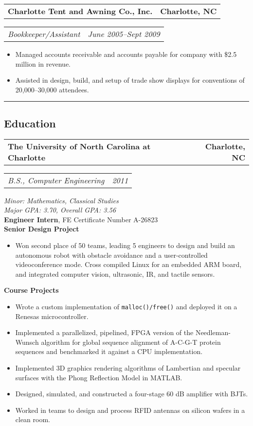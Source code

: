 \documentclass[10pt,letterpaper]{article}
\newcommand{\headerrow}[2]{%
    \begin{tabularx}{\linewidth}{Xr}
	    #1 & #2 \\
    \end{tabularx}
}
\begin{document}
	\headerrow{\textbf{Charlotte Tent and Awning Co., Inc.}}{\textbf{Charlotte, NC}}
	\headerrow{\textit{Bookkeeper/Assistant}}{\textit{June 2005--Sept 2009}}
    \begin{itemize}[label=--]
        \item Managed accounts receivable and accounts payable for company with
            \$2.5 million in revenue.

        \item Assisted in design, build, and setup of trade show displays for
            conventions of 20,000--30,000 attendees.
	\end{itemize}

\vspace{2pt}
\hrule
\vspace{-0.4em}
\subsection*{Education}
	\headerrow{\textbf{The University of North Carolina at Charlotte}}
		{\textbf{Charlotte, NC}}
	\headerrow{\textit{B.S., Computer Engineering}}{\textit{2011}}
		\textit{Minor: Mathematics, Classical Studies} \\
        \textit{Major GPA\@: 3.70, Overall GPA\@: 3.56} \\
        \textbf{Engineer Intern},  FE Certificate Number A-26823 \\
        \textbf{Senior Design Project}
        \begin{itemize}[label=--]
            \item Won second place of 50 teams, leading 5 engineers to design
                and build an autonomous robot with obstacle avoidance and a
                user-controlled videoconference mode.  Cross compiled Linux for
                an embedded ARM board, and integrated computer vision,
                ultrasonic, IR, and tactile sensors.
        \end{itemize}
    \textbf{Course Projects}
    \begin{itemize}[label=--]
        \item Wrote a custom implementation of \texttt{malloc()/free()} %
            and deployed it on a Renesas microcontroller.

        \item Implemented a parallelized, pipelined, FPGA version of the
            Needleman-Wunsch algorithm for global sequence alignment of A-C-G-T
            protein sequences and benchmarked it against a CPU implementation.

        \item Implemented 3D graphics rendering algorithms of Lambertian and
            specular surfaces with the Phong Reflection Model in MATLAB\@.

        \item Designed, simulated, and constructed a four-stage 60 dB amplifier
            with BJTs.

        \item Worked in teams to design and process RFID antennas on silicon
            wafers in a clean room.
    \end{itemize}
\end{document}
